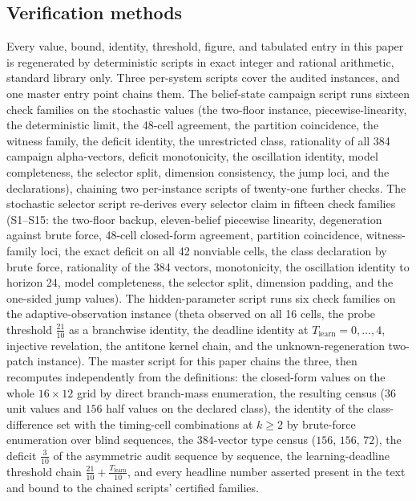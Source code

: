 \documentclass[10pt,twocolumn]{article}
\theoremstyle{plain}
\theoremstyle{definition}
\theoremstyle{remark}
\begin{document}
\subsection{Verification methods}\label{methods}

Every value, bound, identity, threshold, figure, and tabulated entry in
this paper is regenerated by deterministic scripts in exact integer and
rational arithmetic, standard library only. Three per-system scripts
cover the audited instances, and one master entry point chains them.
The belief-state campaign script runs sixteen check families on the
stochastic values (the two-floor instance, piecewise-linearity, the
deterministic limit, the 48-cell agreement, the partition coincidence,
the witness family, the deficit identity, the unrestricted class,
rationality of all 384 campaign alpha-vectors, deficit monotonicity, the
oscillation identity, model completeness, the selector split, dimension
consistency, the jump loci, and the declarations), chaining two
per-instance scripts of twenty-one further checks. The stochastic
selector script re-derives every selector claim in fifteen check
families (S1--S15: the two-floor backup, eleven-belief piecewise
linearity, degeneration against brute force, 48-cell closed-form
agreement, partition coincidence, witness-family loci, the exact
deficit on all 42 nonviable cells, the class declaration by brute
force, rationality of the 384 vectors, monotonicity, the oscillation
identity to horizon 24, model completeness, the selector split,
dimension padding, and the one-sided jump values). The hidden-parameter
script runs six check families on the adaptive-observation instance
(theta observed on all 16 cells, the probe threshold
\(\tfrac{21}{10}\) as a branchwise identity, the deadline identity at
\(T_{\mathrm{learn}} = 0, \dots, 4\), injective revelation, the
antitone kernel chain, and the unknown-regeneration two-patch
instance). The master script for this paper chains the three, then
recomputes independently from the definitions: the closed-form values on
the whole \(16 \times 12\) grid by direct branch-mass enumeration, the
resulting census (\(36\) unit values and \(156\) half values on the
declared class), the identity of the class-difference set with the
timing-cell combinations at \(k \ge 2\) by brute-force enumeration over
blind sequences, the \(384\)-vector type census (\(156\), \(156\),
\(72\)), the deficit \(\tfrac{3}{10}\) of the asymmetric audit sequence
by sequence, the learning-deadline threshold chain
\(\tfrac{21}{10} + \tfrac{T_{\mathrm{learn}}}{10}\), and every headline
number asserted present in the text and bound to the chained scripts'
certified families.
\end{document}
